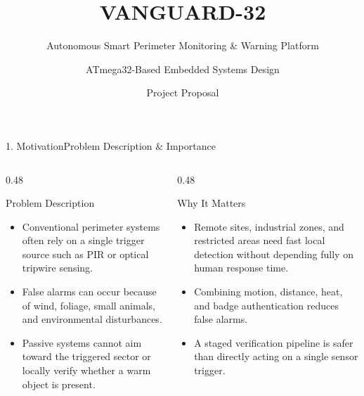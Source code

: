 \documentclass[aspectratio=169, 10pt]{beamer}
\title{VANGUARD-32}
\subtitle{Autonomous Smart Perimeter Monitoring \& Warning Platform}
\author{ATmega32-Based Embedded Systems Design}
\date{Project Proposal}
\begin{document}
\begin{frame}
    \titlepage
\end{frame}

\begin{frame}{1. Motivation}{Problem Description \& Importance}
    \begin{columns}[T]
        \begin{column}{0.48\textwidth}
            \begin{block}{Problem Description}
                \small
                \begin{itemize}
                    \item Conventional perimeter systems often rely on a single trigger source such as PIR or optical tripwire sensing.
                    \item False alarms can occur because of wind, foliage, small animals, and environmental disturbances.
                    \item Passive systems cannot aim toward the triggered sector or locally verify whether a warm object is present.
                \end{itemize}
            \end{block}
        \end{column}
        \begin{column}{0.48\textwidth}
            \begin{block}{Why It Matters}
                \small
                \begin{itemize}
                    \item Remote sites, industrial zones, and restricted areas need fast local detection without depending fully on human response time.
                    \item Combining motion, distance, heat, and badge authentication reduces false alarms.
                    \item A staged verification pipeline is safer than directly acting on a single sensor trigger.
                \end{itemize}
            \end{block}
        \end{column}
    \end{columns}
\end{frame}
\end{document}
